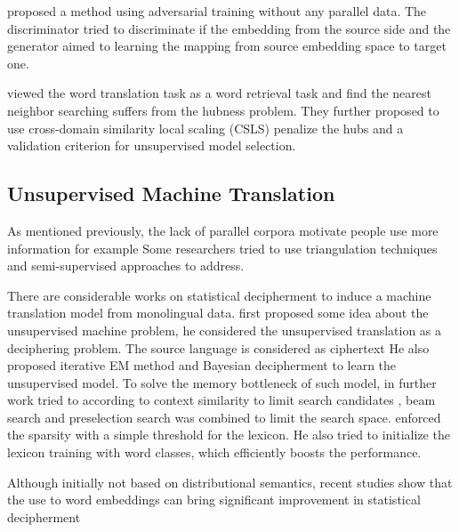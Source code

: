 \cite{cao2016distribution}
 \cite{zhang2017adversarial} proposed a method using adversarial training without any parallel data. The discriminator tried to discriminate if the embedding from the source side and the generator aimed to learning the mapping from source embedding space to target one.



\cite{conneau2017word} viewed the word translation task as a word retrieval task and find the nearest neighbor searching suffers from the hubness problem. They further proposed to use cross-domain similarity local scaling (CSLS) penalize the hubs and a validation criterion for unsupervised model selection.


\subsection{Unsupervised Machine Translation}

As mentioned previously, the lack of parallel corpora motivate people use more information for example 
Some researchers tried to use triangulation techniques and semi-supervised approaches to address.  


\cite{cohn2007machine} \cite{chen2017teacher}

There are considerable works on statistical decipherment  to induce a machine translation model from monolingual data.   
\cite{ravi2011deciphering} first proposed some idea about the unsupervised machine problem, he considered the unsupervised translation as a deciphering problem. The source language is considered as ciphertext He also proposed iterative EM method and Bayesian decipherment to learn the unsupervised model. To solve the memory bottleneck of such model, in further work \cite{nuhn2012deciphering} tried to according to context similarity to limit search candidates \cite{nuhn2014decipherment}, beam search and preselection search was combined to limit the search space. \cite{kim2017unsupervised} enforced the sparsity with a simple threshold for the lexicon. He also tried to initialize the lexicon training with word classes, which efficiently boosts the performance. 

Although initially not based on distributional semantics, recent studies show that the use to word embeddings can bring significant improvement in statistical decipherment \cite{duong2016learning}


